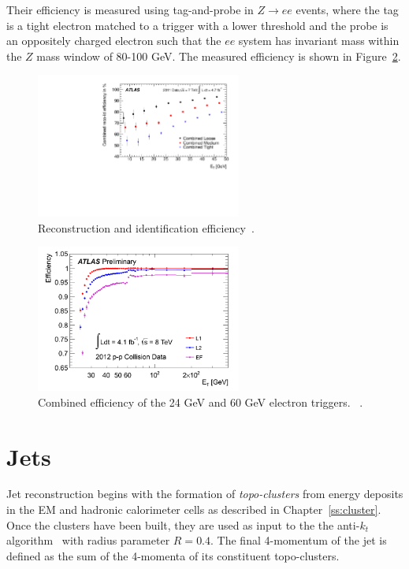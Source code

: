  Their efficiency is measured using tag-and-probe in $Z\rightarrow ee$ events, where the tag is a tight electron matched to a trigger with a lower threshold and the probe is an oppositely charged electron such that the $ee$ system has invariant mass within the $Z$ mass window of 80-100 GeV. The measured efficiency is shown in Figure~\ref{fig:eltrigger}. 

\begin{figure}[hp]
\centering
\includegraphics[width=0.6\textwidth]{fig/obj/electronID.pdf}
\caption{Reconstruction and identification efficiency~\cite{Aad:2014fxa}.}
\label{fig:electronID}
\end{figure}
\begin{figure}[hp]
\centering
\includegraphics[width=0.6\textwidth]{fig/obj/eltrigger.png}
\caption{Combined efficiency of the 24 GeV and 60 GeV electron triggers. ~\cite{eltrig}.}
\label{fig:eltrigger}
\end{figure}

\section{Jets}
Jet reconstruction begins with the formation of \emph{topo-clusters} from energy deposits in the EM and hadronic calorimeter cells as described in Chapter~\ref{ss:cluster}. Once the clusters have been built, they are used as input to the the anti-$k_t$ algorithm~\cite{antikt1,antikt2,antikt3} with radius parameter $R=0.4$. The final 4-momentum of the jet is defined as the sum of the 4-momenta of its constituent topo-clusters. 


